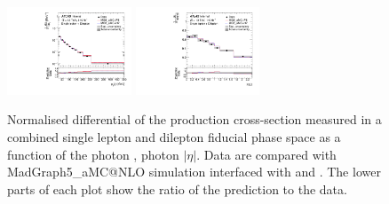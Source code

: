 \begin{figure}[ht]
  \centering
  \includegraphics[width=0.33\textwidth]{figures/diff_xsec/normalized-unfolded-distributions/tty_prod_SLDL/tty_pt_UnfoldedData.pdf}%
  \includegraphics[width=0.33\textwidth]{figures/diff_xsec/normalized-unfolded-distributions/tty_prod_SLDL/tty_eta_UnfoldedData.pdf}%
  \caption{Normalised differential of the \tty production 
  cross-section measured in a combined single lepton and dilepton fiducial phase space as a function of the photon \pt, photon $|\eta|$.
  Data are compared with MadGraph5\_aMC@NLO
  simulation interfaced with \PYTHIA[8] and \HERWIG[7]. The lower parts of each
  plot show the ratio of the prediction to the data. }

  \label{fig:tty_prod_diff_SLDL_norm}
\end{figure}
\FloatBarrier



